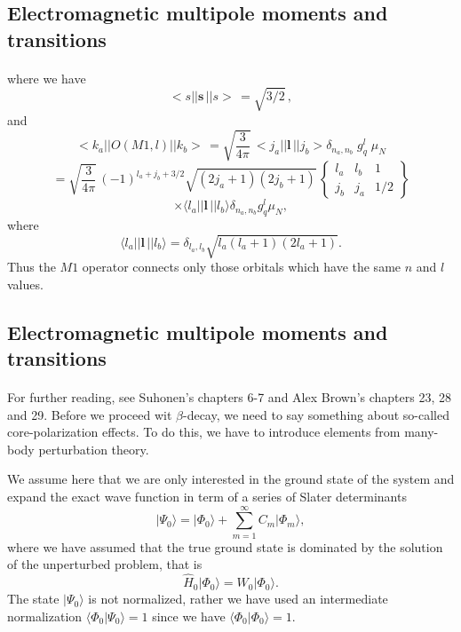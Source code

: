 \documentclass[%
twoside,                 %
final,                   %
10pt]{article}
\begin{document}
\subsection*{Electromagnetic multipole moments and transitions}

\paragraph{}
where we have
\[
<s\vert\vert \mathbf{s}\,\vert\vert s>\, = \sqrt{3/2}\, ,
\]
and
\[
<k_{a}\vert\vert O(M1,l )\vert\vert k_{b}>\, =
\sqrt{ \frac{3}{4\pi }}\,
<j_{a}\vert\vert \mathbf{l}\,\vert\vert j_{b}> \delta _{n_{a},n_{b}} \; g^{l }_{q} \; \mu _{N}
\]
\[
=\sqrt{ \frac{3}{4\pi }}\,
(-1)^{l _{a}+j_{b}+3/2} \sqrt{(2j_{a}+1)(2j_{b}+1)}\,
   \left\{\begin{array}{ccc}  {l _{a}}&  {l _{b}} & {1}\\  {j_{b}}&  {j_{a}}&  {1/2}\end{array}\right\}
\]
\[
\times\langle l _{a}\vert\vert \mathbf{l}\,\vert\vert l _{b}\rangle \delta _{n_{a},n_{b}}g^{l }_{q}\mu _{N} ,       
\]
where
\[
\langle l _{a}\vert\vert \mathbf{l}\,\vert\vert l _{b}\rangle = \delta _{l _{a},l _{b}} \sqrt{l _{a}(l_{a}+1)(2l _{a}+1)}.
\]
Thus the $M1$ operator connects only
those orbitals which have the same $n$ and $l$ values.



\subsection*{Electromagnetic multipole moments and transitions}

\paragraph{}
For further reading, see Suhonen's chapters 6-7 and Alex Brown's chapters 23, 28 and 29. 
Before we proceed wit $\beta$-decay, we need to say something about so-called core-polarization effects.
To do this, we have to introduce elements from many-body perturbation theory.

We assume here that we are only interested in the ground state of the system and 
expand the exact wave function in term of a series of Slater determinants
\[
\vert \Psi_0\rangle = \vert \Phi_0\rangle + \sum_{m=1}^{\infty}C_m\vert \Phi_m\rangle,
\]
where we have assumed that the true ground state is dominated by the 
solution of the unperturbed problem, that is
\[
\hat{H}_0\vert \Phi_0\rangle= W_0\vert \Phi_0\rangle.
\]
The state $\vert \Psi_0\rangle$ is not normalized, rather we have used an intermediate 
normalization $\langle \Phi_0 \vert \Psi_0\rangle=1$ since we have $\langle \Phi_0\vert \Phi_0\rangle=1$.
\end{document}
